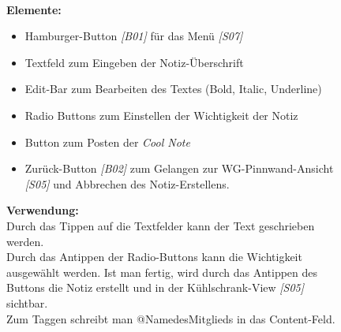\documentclass[a4paper]{scrreprt}
\begin{document}
\begin{figure}[h!]
\begin{minipage}[t]{0.55\linewidth}
    			\hfill 
    			\\\textbf{Elemente:}\\
    			\begin{itemize}
    				\renewcommand\labelitemi{--}
    				\item  Hamburger-Button \textit{{[}B01{]}} für das Menü \textit{{[}S07{]}}
    				\item Textfeld zum Eingeben der Notiz-Überschrift
    				\item Edit-Bar zum Bearbeiten des Textes (Bold,
    				Italic, Underline)
    				\item Radio Buttons zum Einstellen der Wichtigkeit 
    				der Notiz
    				\item Button zum Posten der \textit{Cool Note}
    				\item Zurück-Button \textit{{[}B02{]}} zum Gelangen zur
    				WG-Pinnwand-Ansicht \textit{{[}S05{]}} und Abbrechen des Notiz-Erstellens.
    				
    			\end{itemize}
    			
    			
    			\hfill 
    			
    			\textbf{Verwendung:}\\
    			Durch das Tippen auf die Textfelder kann 
    			der Text geschrieben werden.\\
    			Durch das
    			Antippen der Radio-Buttons kann die 
    			Wichtigkeit ausgewählt werden. Ist man 
    			fertig, wird durch das Antippen des Buttons
    			die Notiz erstellt und  in der
    			Kühlschrank-View \textit{{[}S05{]}} sichtbar.\\ 
    			Zum
    			Taggen schreibt man @NamedesMitglieds  
    			in das Content-Feld.
    			
    			
    			
    		\end{minipage}
    	\end{figure}
    	
    	\clearpage
    	
\end{document}
